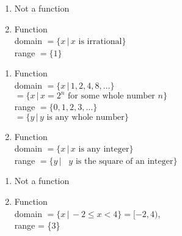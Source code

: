 \documentclass{ximera}
\begin{document}
\begin{multicols}{2}
\begin{enumerate}
\setcounter{enumi}{\value{HW}}

\item  Not a function

\vfill

\columnbreak

\item Function \\ domain $= \{x \, | \, \text{$x$ is irrational} \}$ \\ range $= \{ 1\}$

\setcounter{HW}{\value{enumi}}
\end{enumerate}
\end{multicols}

\begin{multicols}{2}
\begin{enumerate}
\setcounter{enumi}{\value{HW}}

\item Function \\ domain  $= \{x \, | \, 1, 2, 4, 8, \ldots \}$ \\ $= \{x \, | \, \text{$x = 2^{n}$ for some whole number $n$} \}$ \\ range $= \{ 0, 1, 2, 3, \ldots \}$ \\ $= \{y \, | \, \text{$y$ is any whole number}\}$

\vfill

\columnbreak

\item Function \\ domain $= \{x \, | \, \text{$x$ is any integer} \}$ \\ range $= \{y \, | \, \text{ $y$ is the square of an integer}\}$

\setcounter{HW}{\value{enumi}}
\end{enumerate}
\end{multicols}

\begin{multicols}{2}
\begin{enumerate}
\setcounter{enumi}{\value{HW}}

\item Not a function

\vfill

\columnbreak

\item Function \\ domain  $= \{x \, | \, -2 \leq x < 4 \} = [-2, 4)$, \\ range = \{$3$\}

\setcounter{HW}{\value{enumi}}
\end{enumerate}
\end{multicols}
\end{document}
